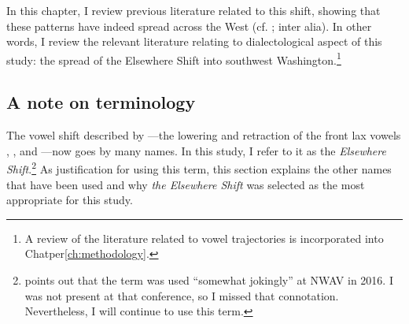 In this chapter, I review previous literature related to this shift, showing that these patterns have indeed spread across the West (cf. \citealt{fridland_etal_2016_pads}; \citealt{fridland_etal_2017_pads} inter alia). In other words, I review the relevant literature relating to dialectological aspect of this study: the spread of the Elsewhere Shift into southwest Washington.\footnote{A review of the literature related to vowel trajectories is incorporated into Chatper\ref{ch:methodology}.}

\subsection{A note on terminology}
\label{sec:terminology}

The vowel shift described by \citet{hinton_etal_1987}---the lowering and retraction of the front lax vowels \bit, \dress, and \bat---now goes by many names. In this study, I refer to it as the \textit{Elsewhere Shift}.\footnote{\citet[20]{strelluf_2019} points out that the term was used ``somewhat jokingly'' at NWAV in 2016. I was not present at that conference, so I missed that connotation. Nevertheless, I will continue to use this term.} As justification for using this term, this section explains the other names that have been used and why \textit{the Elsewhere Shift} was selected as the most appropriate for this study.


